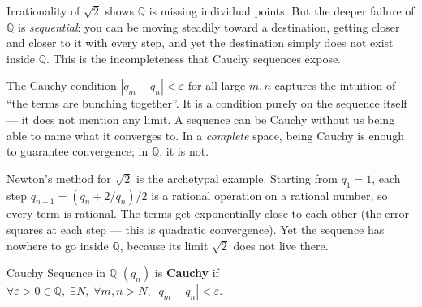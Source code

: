 \documentclass[12pt, openany]{book}
\theoremstyle{plain}
\theoremstyle{definition}
\theoremstyle{remark}
\newcommand{\Q}{\mathbb{Q}}
\newcommand{\eps}{\varepsilon}
\begin{document}
Irrationality of $\sqrt{2}$ shows $\Q$ is missing individual points.  But the deeper failure of $\Q$ is \emph{sequential}: you can be moving steadily toward a destination, getting closer and closer to it with every step, and yet the destination simply does not exist inside $\Q$.  This is the incompleteness that Cauchy sequences expose.

The Cauchy condition $|q_m - q_n| < \eps$ for all large $m, n$ captures the intuition of ``the terms are bunching together''.  It is a condition purely on the sequence itself --- it does not mention any limit.  A sequence can be Cauchy without us being able to name what it converges to.  In a \emph{complete} space, being Cauchy is enough to guarantee convergence; in $\Q$, it is not.

Newton's method for $\sqrt{2}$ is the archetypal example.  Starting from $q_1 = 1$, each step $q_{n+1} = (q_n + 2/q_n)/2$ is a rational operation on a rational number, so every term is rational.  The terms get exponentially close to each other (the error squares at each step --- this is quadratic convergence).  Yet the sequence has nowhere to go inside $\Q$, because its limit $\sqrt{2}$ does not live there.

\begin{defbox}{Cauchy Sequence in $\Q$}
$(q_n)$ is \textbf{Cauchy} if $\forall \eps > 0 \in \Q,\; \exists N,\; \forall m, n > N,\; |q_m - q_n| < \eps$.
\end{defbox}
\color{black}
\end{document}
